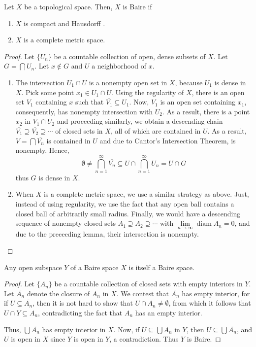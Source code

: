 \begin{theorem}
    Let $X$ be a topological space. Then, $X$ is Baire if 
    \begin{enumerate}[label=(\alph*)]
        \item $X$ is compact and Hausdorff .
        \item $X$ is a complete metric space.
    \end{enumerate}
\end{theorem}
\begin{proof}
Let $\{U_n\}$ be a countable collection of open, dense subsets of $X$. Let $G = \bigcap U_n$. Let $x\notin G$ and $U$ a neighborhood of $x$.
\begin{enumerate}[label=(\alph*)]
\item The intersection $U_1\cap U$ is a nonempty open set in $X$, because $U_1$ is dense in $X$. Pick some point $x_1\in U_1\cap U$. Using the regularity of $X$, there is an open set $V_1$ containing $x$ such that $\overline{V_1}\subseteq U_1$. Now, $V_1$ is an open set containing $x_1$, consequently, has nonempty intersection with $U_2$. As a result, there is a point $x_2$ in $V_1\cap U_2$ and proceeding similarly, we obtain a descending chain $\overline{V_1}\supseteq\overline{V_2}\supseteq\cdots$ of closed sets in $X$, all of which are contained in $U$. As a result, $V = \bigcap\overline{V_n}$ is contained in $U$ and due to Cantor's Intersection Theorem, is nonempty. Hence, 
\begin{equation*}
    \emptyset\ne\bigcap_{n = 1}^\infty\overline{V_n}\subseteq U\cap\bigcap_{n = 1}^\infty U_n = U\cap G
\end{equation*}
thus $G$ is dense in $X$.

\item When $X$ is a complete metric space, we use a similar strategy as above. Just, instead of using regularity, we use the fact that any open ball contains a closed ball of arbitrarily small radius. Finally, we would have a descending sequence of nonempty closed sets $A_1\supseteq A_2\supseteq\cdots$ with $\lim\limits_{n\to\infty}\operatorname{diam} A_n = 0$, and due to the preceeding lemma, their intersection is nonempty.
\end{enumerate}
\end{proof}

\begin{lemma}
    Any open subspace $Y$ of a Baire space $X$ is itself a Baire space.
\end{lemma}
\begin{proof}
    Let $\{A_n\}$ be a countable collection of closed sets with empty interiors in $Y$. Let $\overline{A_n}$ denote the closure of $A_n$ in $X$. We contest that $\overline{A_n}$ has empty interior, for if $U\subseteq\overline{A_n}$, then it is not hard to show that $U\cap A_n\ne\emptyset$, from which it follows that $U\cap Y\subseteq A_n$, contradicting the fact that $A_n$ has an empty interior.

    Thus, $\bigcup\overline{A_n}$ has empty interior in $X$. Now, if $U\subseteq\bigcup A_n$ in $Y$, then $U\subseteq\bigcup\overline{A_n}$, and $U$ is open in $X$ since $Y$ is open in $Y$, a contradiction. Thus $Y$ is Baire.
\end{proof}

